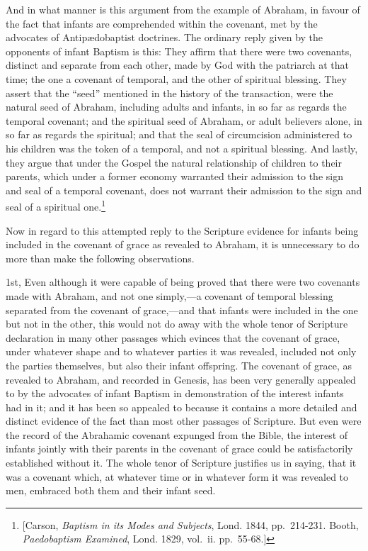 \documentclass[]{book}
\begin{document}
And in what manner is this argument from the example of Abraham, in favour of the fact that infants are comprehended within the covenant, met by the advocates of Antipædobaptist doctrines. The ordinary reply given by the opponents of infant Baptism is this: They affirm that there were two covenants, distinct and separate from each other, made by God with the patriarch at that time; the one a covenant of temporal, and the other of spiritual blessing. They assert that the ``seed'' mentioned in the history of the transaction, were the natural seed of Abraham, including adults and infants, in so far as regards the temporal covenant; and the spiritual seed of Abraham, or adult believers alone, in so far as regards the spiritual; and that the seal of circumcision administered to his children was the token of a temporal, and not a spiritual blessing. And lastly, they argue that under the Gospel the natural relationship of children to their parents, which under a former economy warranted their admission to the sign and seal of a temporal covenant, does not warrant their admission to the sign and seal of a spiritual one.\footnote{{[}Carson, \emph{Baptism in its Modes and Subjects}, Lond. 1844, pp.~214-231. Booth, \emph{Paedobaptism Examined}, Lond. 1829, vol.~ii. pp.~55-68.{]}}

Now in regard to this attempted reply to the Scripture evidence for infants being included in the covenant of grace as revealed to Abraham, it is unnecessary to do more than make the following observations.

1st, Even although it were capable of being proved that there were two covenants made with Abraham, and not one simply,---a covenant of temporal blessing separated from the covenant of grace,---and that infants were included in the one but not in the other, this would not do away with the whole tenor of Scripture declaration in many other passages which evinces that the covenant of grace, under whatever shape and to whatever parties it was revealed, included not only the parties themselves, but also their infant offspring. The covenant of grace, as revealed to Abraham, and recorded in Genesis, has been very generally appealed to by the advocates of infant Baptism in demonstration of the interest infants had in it; and it has been so appealed to because it contains a more detailed and distinct evidence of the fact than most other passages of Scripture. But even were the record of the Abrahamic covenant expunged from the Bible, the interest of infants jointly with their parents in the covenant of grace could be satisfactorily established without it. The whole tenor of Scripture justifies us in saying, that it was a covenant which, at whatever time or in whatever form it was revealed to men, embraced both them and their infant seed.
\end{document}
